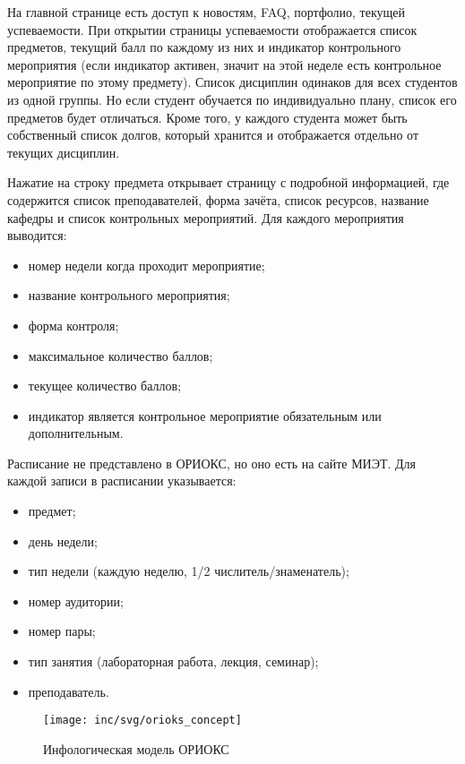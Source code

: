 На главной странице есть доступ к новостям, FAQ, портфолио, текущей успеваемости.
При открытии страницы успеваемости отображается список предметов, текущий балл по каждому из них и индикатор контрольного мероприятия (если индикатор активен, значит на этой неделе есть контрольное мероприятие по этому предмету).
Список дисциплин одинаков для всех студентов из одной группы.
Но если студент обучается по индивидуально плану, список его предметов будет отличаться.
Кроме того, у каждого студента может быть собственный список долгов, который хранится и отображается отдельно от текущих дисциплин.

Нажатие на строку предмета открывает страницу с подробной информацией, где содержится список преподавателей, форма зачёта, список ресурсов, название кафедры и список контрольных мероприятий.
Для каждого мероприятия выводится:
\begin{itemize}
  \item номер недели когда проходит мероприятие;
  \item название контрольного мероприятия;
  \item форма контроля;
  \item максимальное количество баллов;
  \item текущее количество баллов;
  \item индикатор является контрольное мероприятие обязательным или дополнительным.
\end{itemize}

Расписание не представлено в ОРИОКС, но оно есть на сайте МИЭТ.
Для каждой записи в расписании указывается:
\begin{itemize}
  \item предмет;
  \item день недели;
  \item тип недели (каждую неделю, 1/2 числитель/знаменатель);
  \item номер аудитории;
  \item номер пары;
  \item тип занятия (лабораторная работа, лекция, семинар);
  \item преподаватель.
\end{itemize}

\nocite{db}
\begin{figure}[ht]
  \centering
  \texttt{[image: inc/svg/orioks\_concept]}
  \caption{Инфологическая модель ОРИОКС}
  \label{fig:orioksConcept}
\end{figure}

